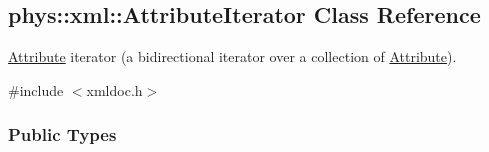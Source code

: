 \hypertarget{classphys_1_1xml_1_1AttributeIterator}{
\subsection{phys::xml::AttributeIterator Class Reference}
\label{classphys_1_1xml_1_1AttributeIterator}
}


\hyperlink{classphys_1_1xml_1_1Attribute}{Attribute} iterator (a bidirectional iterator over a collection of \hyperlink{classphys_1_1xml_1_1Attribute}{Attribute}).  




{\ttfamily \#include $<$xmldoc.h$>$}

\subsubsection*{Public Types}
